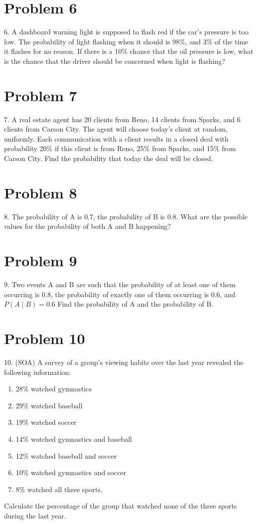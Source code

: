\documentclass{article}
\begin{document}
	\section*{Problem 6} 
6. A dashboard warning light is supposed to flash red if the car's pressure is too low. The probability of light flashing when it should is 98\%, and 3\% of the time it flashes for no reason. If there is a 10\% chance that the oil pressure is low, what is the chance that the driver should be concerned when light is flashing?
	\section*{Problem 7} 
	7. A real estate agent has 20 clients from Reno, 14 clients from Sparks, and 6 clients from Carson City. The agent will choose today's client at random, uniformly. Each communication with a client results in a closed deal with probability 20\% if this client is from Reno, 25\% from Sparks, and 15\% from Carson City. Find the probability that today the deal will be closed. 

	\section*{Problem 8} 
	8. The probability of A is 0.7, the probability of B is 0.8. What are the possible values for the probability of both A and B happening?

	\section*{Problem 9} 
	9. Two events A and B are such that the probability of at least one of them occurring is 0.8, the probability of exactly one of them occurring is 0.6, and  $P(A\mid B) = 0.6$  Find the probability of A and the probability of B. 
	
	\section*{Problem 10} 

	10. (SOA) A survey of a group’s viewing habits over the last year revealed the following
information: 

\begin{enumerate}[label=(\roman*)]
		\item 28\% watched gymnastics
    \item 29\% watched baseball
    \item 19\% watched soccer
    \item 14\% watched gymnastics and baseball
    \item 12\% watched baseball and soccer
    \item 10\% watched gymnastics and soccer
    \item  8\% watched all three sports.
\end{enumerate}

Calculate the percentage of the group that watched none of the three sports during the last year.
\end{document}
